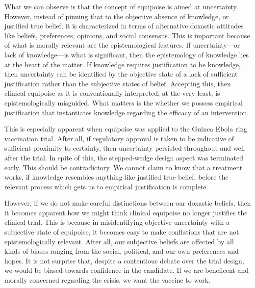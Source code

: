 \documentclass[letterpaper,notitlepage,12pt]{article}
\begin{document}
What we can observe is that the concept of equipoise is aimed at uncertainty.
However,
instead of pinning that to the objective absence of
knowledge, or justified true belief, it is characterized in terms of alternative
doxastic attitudes like beliefs, preferences, opinions, and social consensus.
This is important because of what is morally relevant are the epistemological
features.
If uncertainty---or lack of knowledge---is what is significant, then the
epistemology of knowledge lies at the heart of the matter.
If knowledge requires justification to be knowledge, then uncertainty can be
identified by the objective state of a lack of sufficient justification rather
than the subjective states of belief.
Accepting this, then clinical equipoise as it is conventionally interpreted, at
the very least, is epistemologically misguided.
What matters is the whether we possess empirical justification that instantiates
knowledge regarding the efficacy of an intervention.

This is especially apparent when equipoise was applied to the Guinea Ebola ring
vaccination trial.
After all, if regulatory approval is taken to be indicative of sufficient
proximity to certainty, then uncertainty persisted throughout and well after the
trial.
In spite of this, the stepped-wedge design aspect was terminated early.
This should be contradictory.
We cannot claim to know that a treatment works, if knowledge resembles anything
like justified true belief, before the relevant process which gets us to
empirical justification is complete.

However, if we do not make careful distinctions between our doxastic beliefs,
then it becomes apparent how we might think clinical equipoise no longer
justifies the clinical trial. 
This is because in misidentifying objective uncertainty with a subjective state 
of equipoise, it becomes easy to make conflations that are not epistemologically
relevant.
After all, our subjective beliefs are affected by all kinds of biases ranging
from the social, political, and our own preferences and hopes.
It is not surprise that, despite a contentious debate over the trial design, we
would be biased towards confidence in the candidate.
If we are beneficent and morally concerned regarding the crisis, we want the
vaccine to work.
\end{document}

